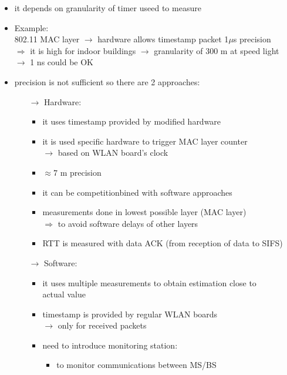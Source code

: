 \begin{itemize} 
    \item it depends on granularity of timer useed to measure
    \item Example:\\[0.15cm]
    \hspace*{-0.05cm}802.11 MAC layer $\rightarrow$ hardware allows timestamp packet  1$\mu$s precision\\
    $\Rightarrow$ it is high for indoor buildings $\rightarrow$ granularity of 300 m at speed light\\
    $\rightarrow$ 1 ns could be OK
    \item precision is not sufficient so there are 2 approaches:
    \begin{itemize}
        \item[$\rightarrow$] Hardware:
        \begin{itemize}
            \item it uses timestamp provided by modified hardware
            \item it is used specific hardware to trigger MAC layer counter\\
            $\rightarrow$ based on WLAN board's clock
            \item $\approx 7$ m precision
            \item it can be competitionbined with software approaches
            \item measurements done in lowest possible layer (MAC layer)\\
            $\Rightarrow$ to avoid software delays of other layers
            \item RTT is measured with data ACK (from reception of data to SIFS)
        \end{itemize}
        \newpage
        \item[$\rightarrow$] Software:
        \begin{itemize}
            \item it uses multiple measurements to obtain estimation close to\\
            actual value
            \item timestamp is provided by regular WLAN boards\\
            $\rightarrow$ only for received packets
            \item need to introduce monitoring station:
            \begin{itemize}
                \item to monitor communications between MS/BS

\end{itemize}
\end{itemize}
\end{itemize}
\end{itemize}
